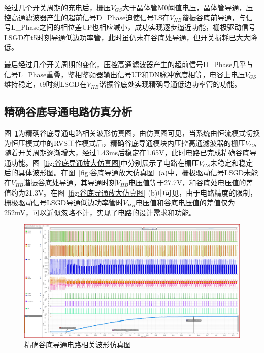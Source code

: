 经过几个开关周期的充电后，栅压$V_{GS}$大于晶体管M0阈值电压，晶体管导通，压控高通滤波器产生的超前信号D\_Phase迫使信号LS在$V_{HB}$谐振谷底前导通，与信号L\_Phase之间的相位差UP也相应减小，成功实现逐步逼近功能，栅极驱动信号LSGD在t5时刻导通低边功率管，此时虽仍未在谷底处导通，但开关损耗已大大降低。

最后经过几个开关周期的变化，压控高通滤波器产生的超前信号D\_Phase几乎与信号L\_Phase重叠，鉴相鉴频器输出信号UP和DN脉冲宽度相等，电容上电压$V_{GS}$维持稳定，t9时刻LSGD在$V_{HB}$谐振谷底处实现精确导通低边功率管的功能。

\subsection{精确谷底导通电路仿真分析}


图~\ref{fig:谷底导通仿真图}为精确谷底导通电路相关波形仿真图，由仿真图可见，当系统由恒流模式切换为恒压模式中的RVS工作模式后，精确谷底导通模块内压控高通滤波器的栅压$V_{GS}$随着开关周期逐渐增大，经过1.43ms后稳定在1.65V，此时电路已完成精确谷底导通功能。图~\ref{fig:谷底导通放大仿真图}中分别展示了电路在栅压$V_{GS}$未稳定和稳定后的具体波形图。在图~\ref{fig:谷底导通放大仿真图} (a)中，栅极驱动信号LSGD未能在$V_{HB}$谐振谷底处导通，其导通时刻$V_{HB}$电压值等于27.7V，和谷底处电压值的差值约为21.3V。在图~\ref{fig:谷底导通放大仿真图} (b)中可见，由于电路精度的限制，栅极驱动信号LSGD导通低边功率管时$V_{HB}$电压值和谷底电压值的差值仅为252mV，可以近似忽略不计，实现了电路的设计需求和功能。


\begin{figure}[htbp] 
    \centering
    \includegraphics[width=0.8\linewidth]{figures/valley_switch.png}
    \caption{精确谷底导通电路相关波形仿真图}
    \label{fig:谷底导通仿真图}
\end{figure} 


